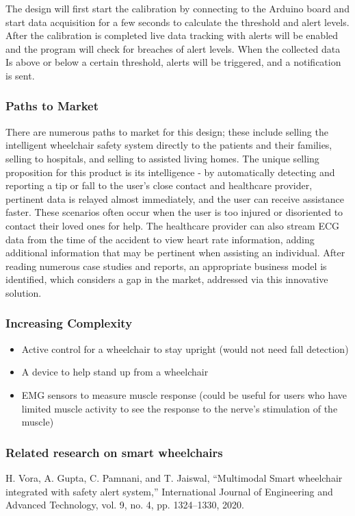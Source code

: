 \documentclass[11pt]{article}
\begin{document}
The design will first start the calibration by connecting to the Arduino board and start data acquisition for a few seconds to calculate the threshold and alert levels. After the calibration is completed live data tracking with alerts will be enabled and the program will check for breaches of alert levels. When the collected data Is above or below a certain threshold, alerts will be triggered, and a notification is sent.

\subsubsection{Paths to Market}
\label{sec:orgd07b39b}
There are numerous paths to market for this design; these include selling the intelligent wheelchair safety system directly to the patients and their families, selling to hospitals, and selling to assisted living homes. The unique selling proposition for this product is its intelligence - by automatically detecting and reporting a tip or fall to the user’s close contact and healthcare provider, pertinent data is relayed almost immediately, and the user can receive assistance faster. These scenarios often occur when the user is too injured or disoriented to contact their loved ones for help. The healthcare provider can also stream ECG data from the time of the accident to view heart rate information, adding additional information that may be pertinent when assisting an individual. After reading numerous case studies and reports, an appropriate business model is identified, which considers a gap in the market, addressed via this innovative solution.

\subsubsection{Increasing Complexity}
\label{sec:org794ab4a}
\begin{itemize}
\item Active control for a wheelchair to stay upright (would not need fall detection)
\item A device to help stand up from a wheelchair
\item EMG sensors to measure muscle response (could be useful for users who have limited muscle activity to see the response to the nerve’s stimulation of the muscle)
\end{itemize}


\subsubsection{Related research on smart wheelchairs}
\label{sec:orgee6eb4b}
H. Vora, A. Gupta, C. Pamnani, and T. Jaiswal, “Multimodal Smart wheelchair integrated with safety alert system,” International Journal of Engineering and Advanced Technology, vol. 9, no. 4, pp. 1324–1330, 2020.
\end{document}
